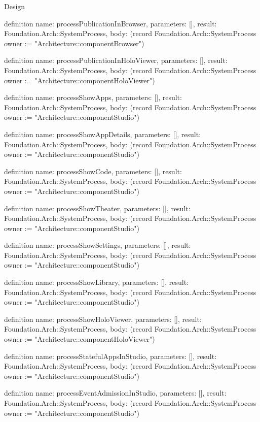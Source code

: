\begin{lexlean}{Design}
\begin{semanticmodule}
definition{
  name: processPublicationInBrowser,
  parameters: [],
  result: Foundation.Arch::SystemProcess,
  body: (record Foundation.Arch::SystemProcess {owner := "Architecture::componentBrowser"})
}

definition{
  name: processPublicationInHoloViewer,
  parameters: [],
  result: Foundation.Arch::SystemProcess,
  body: (record Foundation.Arch::SystemProcess {owner := "Architecture::componentHoloViewer"})
}

definition{
  name: processShowApps,
  parameters: [],
  result: Foundation.Arch::SystemProcess,
  body: (record Foundation.Arch::SystemProcess {owner := "Architecture::componentStudio"})
}

definition{
  name: processShowAppDetails,
  parameters: [],
  result: Foundation.Arch::SystemProcess,
  body: (record Foundation.Arch::SystemProcess {owner := "Architecture::componentStudio"})
}

definition{
  name: processShowCode,
  parameters: [],
  result: Foundation.Arch::SystemProcess,
  body: (record Foundation.Arch::SystemProcess {owner := "Architecture::componentStudio"})
}

definition{
  name: processShowTheater,
  parameters: [],
  result: Foundation.Arch::SystemProcess,
  body: (record Foundation.Arch::SystemProcess {owner := "Architecture::componentStudio"})
}

definition{
  name: processShowSettings,
  parameters: [],
  result: Foundation.Arch::SystemProcess,
  body: (record Foundation.Arch::SystemProcess {owner := "Architecture::componentStudio"})
}

definition{
  name: processShowLibrary,
  parameters: [],
  result: Foundation.Arch::SystemProcess,
  body: (record Foundation.Arch::SystemProcess {owner := "Architecture::componentStudio"})
}

definition{
  name: processShowHoloViewer,
  parameters: [],
  result: Foundation.Arch::SystemProcess,
  body: (record Foundation.Arch::SystemProcess {owner := "Architecture::componentHoloViewer"})
}

definition{
  name: processStatefulAppsInStudio,
  parameters: [],
  result: Foundation.Arch::SystemProcess,
  body: (record Foundation.Arch::SystemProcess {owner := "Architecture::componentStudio"})
}

definition{
  name: processEventAdmissionInStudio,
  parameters: [],
  result: Foundation.Arch::SystemProcess,
  body: (record Foundation.Arch::SystemProcess {owner := "Architecture::componentStudio"})
}


\end{semanticmodule}
\end{lexlean}
